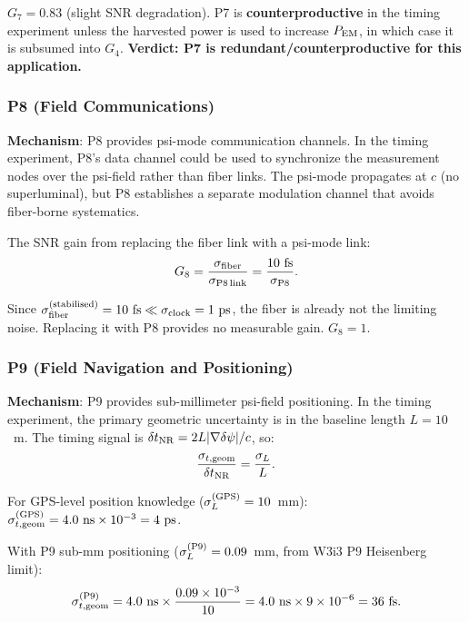 $G_7 = 0.83$ (slight SNR degradation). P7 is \textbf{counterproductive}
in the timing experiment unless the harvested power is used to increase
$P_{\rm EM}$, in which case it is subsumed into $G_4$. \textbf{Verdict:
P7 is redundant/counterproductive for this application.}

\subsubsection*{P8 (Field Communications)}

\textbf{Mechanism}: P8 provides psi-mode communication channels. In the
timing experiment, P8's data channel could be used to synchronize the
measurement nodes over the psi-field rather than fiber links. The psi-mode
propagates at $c$ (no superluminal), but P8 establishes a separate modulation
channel that avoids fiber-borne systematics.

The SNR gain from replacing the fiber link with a psi-mode link:
\begin{equation}
G_8 = \frac{\sigma_{\rm fiber}}{\sigma_{\rm P8\,link}} = \frac{10~\text{fs}}{\sigma_{\rm P8}}.
\label{eq:G8}
\end{equation}

Since $\sigma_{\rm fiber}^{(\rm stabilised)} = 10~\text{fs} \ll \sigma_{\rm clock}
= 1~\text{ps}$, the fiber is already not the limiting noise. Replacing it
with P8 provides no measurable gain. $G_8 = 1$.

\subsubsection*{P9 (Field Navigation and Positioning)}

\textbf{Mechanism}: P9 provides sub-millimeter psi-field positioning. In the
timing experiment, the primary geometric uncertainty is in the baseline length
$L = 10$~m. The timing signal is $\delta t_{\rm NR} = 2L|\nabla\delta\psi|/c$,
so:
\begin{equation}
\frac{\sigma_{t,\rm geom}}{\delta t_{\rm NR}} = \frac{\sigma_L}{L}.
\label{eq:geometric_noise}
\end{equation}

For GPS-level position knowledge ($\sigma_L^{(\rm GPS)} = 10$~mm):
$\sigma_{t,\rm geom}^{(\rm GPS)} = 4.0~\text{ns} \times 10^{-3} = 4~\text{ps}$.

With P9 sub-mm positioning ($\sigma_L^{(\rm P9)} = 0.09$~mm, from W3i3 P9
Heisenberg limit):
\begin{equation}
\sigma_{t,\rm geom}^{(\rm P9)} = 4.0~\text{ns} \times \frac{0.09\times 10^{-3}}{10}
= 4.0~\text{ns} \times 9\times 10^{-6} = 36~\text{fs}.
\label{eq:P9_geom_noise}
\end{equation}

